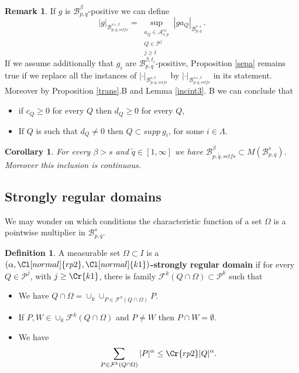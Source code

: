 \documentclass{amsart}
\newtheorem{corollary}[theorem]{Corollary}
\theoremstyle{definition}
\newtheorem{definition}[theorem]{Definition}
\newtheorem{remark}[theorem]{Remark}
\newcommand{\Cll}[2][normal]{\Cl[#1]{#2}}
\newcommand{\Crr}[1]{\Cr{#1}}
\begin{document}
\begin{remark}\label{posrem} If $g$ is    $\mathcal{B}^\beta_{p,q}$-positive we can define
$$|g|_{\mathcal{B}^{s+,t}_{p,q,selfs}}=\sup_{\substack{ a_Q \in \mathcal{A}^{sz}_{s,p}\\ Q\in \mathcal{P}^j \\ j\geq t}} |ga_Q|_{\mathcal{B}^{s+}_{p,q}}.$$
 If we assume additionally that $g_i$ are $\mathcal{B}^{\beta,t_i}_{p,q}$-positive, Proposition \ref{sepa} remains true if we replace all the instances  of $|\cdot|_{\mathcal{B}^{s,t}_{p,q,selfs}}$ by $|\cdot|_{\mathcal{B}^{s+,t}_{p,q,selfs}}$  in its statement. Moreover  by Proposition \ref{trans}.B and Lemma \ref{incint3}. B we can conclude that
 \begin{itemize}
 \item[i.]  if $c_Q\geq 0$ for every $Q$ then $d_Q\geq 0$ for every $Q$,
 \item[ii.] If $Q$ is such that $d_Q\neq 0$ then $Q\subset supp \ g_i$, for some $i\in \Lambda$. 
\end{itemize}
\end{remark} 

\begin{corollary}\label{23er} For every $\beta > s$ and $\tilde{q}\in [1,\infty]$  we have  $\mathcal{B}^\beta_{p,\tilde{q},selfs} \subset M(\mathcal{B}^s_{p,q})$. Moreover this inclusion is continuous. 
\end{corollary} 




\subsection{Strongly regular domains }\label{srd} We may wonder on which conditions the characteristic function of a set  $\Omega$ is a pointwise multiplier in $\mathcal{B}^{s}_{p,q}$.  
\begin{definition} A measurable set $\Omega\subset I$ is  a {\bf $(\alpha,\Cll{rp2},\Cll{k1} )$-strongly regular domain}  if  for every $Q\in \mathcal{P}^j$, with $j\geq \Crr{k1}$,  there is  family $\mathcal{F}^k(Q\cap \Omega) \subset \mathcal{P}^k$  such that 
\begin{itemize}
\item[i.] We have $Q\cap \Omega = \cup_{k} \cup_{P\in \mathcal{F}^k(Q\cap \Omega)} P$.
\item[ii.] If $P,W \in \cup_{k} \mathcal{F}^k(Q\cap \Omega)$ and $P\neq W$ then $P\cap W=\emptyset$. 
\item[iii.] We have
\begin{equation} \sum_{P\in \mathcal{F}^k(Q\cap \Omega)} |P|^{\alpha}\leq \Crr{rp2}  |Q|^{\alpha}.\end{equation} 
\end{itemize}
\end{definition} 
\end{document}
